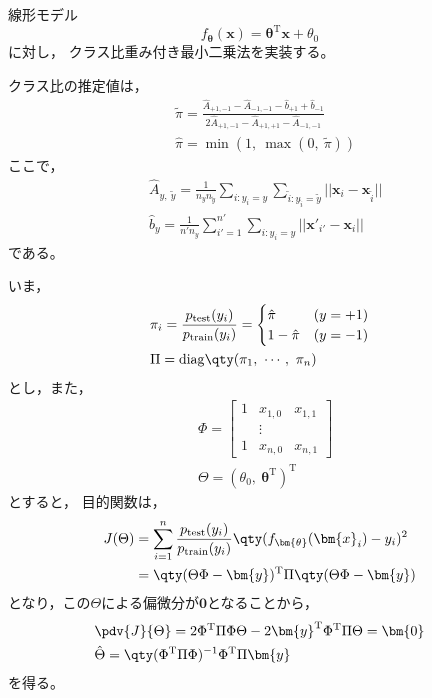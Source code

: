 \documentclass[class=jsarticle, crop=false, dvipdfmx, fleqn]{standalone}
\begin{document}
\section{}

線形モデル
\begin{equation}
    f_{\bm{\theta}} (\bm{x}) = \bm{\theta}^\mathrm{T} \bm{x} + \theta_0
\end{equation}
に対し，
クラス比重み付き最小二乗法を実装する。

クラス比の推定値は，
\begin{align}
    & \tilde{\pi} = \frac{\hat{A}_{+1, -1} - \hat{A}_{-1, -1} - \hat{b}_{+1} + \hat{b}_{-1}}{2 \hat{A}_{+1, -1} - \hat{A}_{+1, +1} - \hat{A}_{-1, -1}} \\
    & \hat{\pi} = \min(1,\ \max(0,\ \tilde{\pi}))
\end{align}
ここで，
\begin{align}
    & \hat{A}_{y,\ \tilde{y}} = \frac{1}{n_y n_{\tilde{y}}} \sum_{i: y_i = y} \sum_{\tilde{i}: y_{\tilde{i}} = \tilde{y}} ||\bm{x}_i - \bm{x}_{\tilde{i}}|| \\
    & \hat{b}_y = \frac{1}{n' n_y} \sum_{i' = 1}^{n'} \sum_{i: y_i = y} ||\bm{x}'_{i'} - \bm{x}_i||
\end{align}
である。

いま，
\begin{align}
    & \pi_i = \frac{p_\mathrm{test}(y_i)}{p_\mathrm{train}(y_i)} =
        \begin{cases}
            \hat{\pi} & (y = +1) \\
            1 - \hat{\pi} & (y = -1)
        \end{cases} \\
    & \Pi = \mathrm{diag}\qty(\pi_1,\ \cdots,\ \pi_n)
\end{align}
とし，また，
\begin{align}
    & \Phi =
        \begin{bmatrix}
            1 & x_{1, 0} & x_{1, 1} \\
            & \vdots & \\
            1 & x_{n, 0} & x_{n, 1}
        \end{bmatrix} \\
    & \Theta = (\theta_0,\ \bm{\theta}^\mathrm{T})^\mathrm{T}
\end{align}
とすると，
目的関数は，
\begin{align}
    J(\Theta)
        & = \sum_{i=1}^{n} \frac{p_\mathrm{test}(y_i)}{p_\mathrm{train}(y_i)} \qty(f_{\bm{\theta}} (\bm{x}_i) - y_i)^2 \\
        & = \qty(\Theta \Phi - \bm{y})^\mathrm{T} \Pi \qty(\Theta \Phi - \bm{y})
\end{align}
となり，この\(\Theta\)による偏微分が\(\bm{0}\)となることから，
\begin{align}
    & \pdv{J}{\Theta} = 2 \Phi^\mathrm{T} \Pi \Phi \Theta -2 \bm{y}^\mathrm{T} \Phi^\mathrm{T} \Pi \Theta = \bm{0} \\
    & \hat{\Theta} = \qty(\Phi^\mathrm{T} \Pi \Phi)^{-1} \Phi^\mathrm{T} \Pi \bm{y}
\end{align}
を得る。
\end{document}
